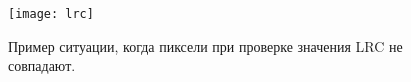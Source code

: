 \begin{figure}[!h]
	\begin{minipage}[b]{1.0\linewidth}
		\centering
		\centerline{ \texttt{[image: lrc]} }
	\end{minipage}
    \caption{Пример ситуации, когда пиксели при проверке значения LRC не совпадают. }
	\label{fig:lrc}
\end{figure}
